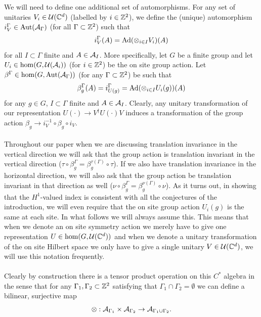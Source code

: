 \documentclass[12pt,a4paper,twoside]{article}
\numberwithin{equation}{section}
\begin{document}
We will need to define one additional set of automorphisms. For any set of unitaries $V_i\in\UU(\CC^d)$ (labelled by $i\in\ZZ^2$), we define the (unique) automorphism $i_V^\Gamma\in\Aut{\AA_\Gamma}$ (for all $\Gamma\subset \ZZ^2$) such that
\begin{equation}
i_V^\Gamma (A)=\Ad{\otimes_{i\in I} V_i}(A)
\end{equation}
for all $I\subset\Gamma$ finite and $A\in\AA_I$. More specifically, let $G$ be a finite group and let $U_i\in\hom(G,\UU(\AA_i))$ (for $i\in\ZZ^2$) be the on site group action. Let $\beta^\Gamma\in\hom(G,\Aut{\AA_\Gamma})$ (for any $\Gamma\subset\ZZ^2$) be such that
\begin{equation}
\beta^\Gamma_g(A)=i_{U(g)}^\Gamma=\Ad{\otimes_{i\in I} U_i(g)}(A)
\end{equation}
for any $g\in G$, $I\subset\Gamma$ finite and $A\in\AA_I$. Clearly, any unitary transformation of our representation $U(\cdot)\rightarrow V^\dagger U(\cdot) V$ induces a transformation of the group action $\beta_g\rightarrow i_{V}^{-1}\circ\beta_g\circ i_V$.\\\\
Throughout our paper when we are discussing translation invariance in the vertical direction we will ask that the group action is translation invariant in the vertical direction ($\tau\circ\beta_g^\Gamma=\beta_g^{\tau(\Gamma)}\circ\tau$). If we also have translation invariance in the horizontal direction, we will also ask that the group action be translation invariant in that direction as well ($\nu\circ\beta_g^\Gamma=\beta_g^{\nu(\Gamma)}\circ\nu$). As it turns out, in showing that the $H^1$-valued index is consistent with all the conjectures of the introduction, we will even require that the on site group action $U_i(g)$ is the same at each site. In what follows we will always assume this. This means that when we denote an on site symmetry action we merely have to give one representation $U\in\hom(G,\UU(\CC^d))$ and when we denote a unitary transformation of the on site Hilbert space we only have to give a single unitary $V\in \UU(\CC^d)$, we will use this notation frequently.\\\\
Clearly by construction there is a tensor product operation on this $C^*$ algebra in the sense that for any $\Gamma_1,\Gamma_2\subset\ZZ^2$ satisfying that $\Gamma_1\cap\Gamma_2=\emptyset$ we can define a bilinear, surjective map
\begin{equation}
\otimes:\AA_{\Gamma_1}\times\AA_{\Gamma_2}\rightarrow \AA_{\Gamma_1\cup\Gamma_2}.
\end{equation}
\end{document}
